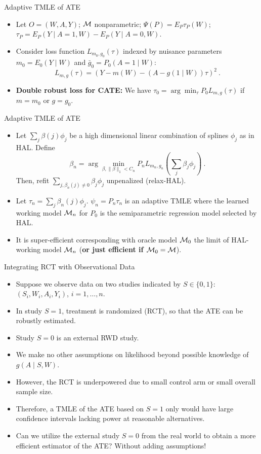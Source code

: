 \documentclass[t]{beamer}
\begin{document}
\begin{frame}{Adaptive TMLE of ATE}
\begin{itemize}
\item Let $O=(W,A,Y)$; ${\cal M}$ nonparametric; $\Psi(P)=E_P\tau_P(W)$; $\tau_P=E_P(Y\mid A=1,W)-E_P(Y\mid A=0,W)$.
\item Consider loss function $L_{m_0,g_0}(\tau)$ indexed by nuisance parameters $m_0=E_0(Y\mid W)$ and $\bar{g}_0=P_0(A=1\mid W)$:
\[
  L_{m,g}(\tau)=\left(Y - m(W) - (A - g(1\mid W))\tau\right)^2 \ .
\]
\item {\bf Double robust loss for CATE:} We have $\tau_0=\arg\min_{\tau}P_0 L_{m,g}(\tau)$ if $m=m_0$ or $g=g_0$. 
\end{itemize}
\end{frame}

\begin{frame}{Adaptive TMLE of ATE}
\begin{itemize}
\item Let $\sum_j\beta(j)\phi_j$ be a high dimensional linear combination of splines $\phi_j$ as in HAL. Define
\[
\beta_n=\arg\min_{\beta, \lVert \beta \rVert_{1} < C_n} P_n L_{m_n,g_n}\left(\sum_j \beta_j\phi_j\right) \ .
\]
Then, refit $\sum_{j,\beta_n(j)\not =0}\beta_j\phi_j$ unpenalized (relax-HAL). 
\item Let $\tau_n=\sum_j\beta_n(j)\phi_j$. $\psi_n=P_n \tau_n$ is an adaptive TMLE  where the learned working model ${\cal M}_n$ for $P_0$ is the semiparametric regression model selected by HAL.
\item It is super-efficient corresponding with oracle model ${\cal M}_0$ the limit of HAL-working model ${\cal M}_n$ ({\bf or just efficient if ${\cal M}_0={\cal M}$}).
\end{itemize}
\end{frame}
\begin{frame}{Integrating RCT with Observational Data}
\begin{itemize}
\item Suppose we observe data on two studies indicated by $S\in \{0,1\}$: $(S_i,W_i,A_i,Y_i)$, $i=1,\ldots,n$. 
\item In study $S=1$, treatment is randomized (RCT), so that the ATE can be robustly estimated.
\item Study $S=0$ is an external RWD study. 
\item We make no other assumptions on likelihood beyond possible knowledge of $g(A\mid S,W)$.
\item However, the RCT is underpowered due to small control arm or small overall sample size.\item Therefore, a TMLE of the ATE based on $S=1$ only would have large confidence intervals lacking power at reasonable alternatives. \item Can we utilize the external study $S=0$ from the real world to obtain a more efficient estimator of the ATE?  Without adding assumptions!
\end{itemize}
\end{frame}
\end{document}
